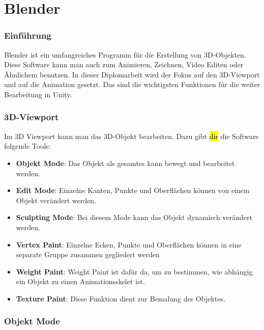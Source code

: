 \pagebreak
{}
\chapter{Blender}

\subsection{Einführung}
Blender ist ein umfangreiches Programm für die Erstellung von 3D-Objekten. Diese Software kann man auch zum Animieren, Zeichnen, Video Editen oder Ähnlichem benutzen. 
In dieser Diplomarbeit wird der Fokus auf den 3D-Viewport und auf die Animation gesetzt. Das sind die wichtigsten Funktionen für die weiter Bearbeitung in Unity. 

\subsection{3D-Viewport}
Im 3D Viewport kann man das 3D-Objekt bearbeiten. Dazu gibt \hl{dir} die Software folgende Tools: 

\begin{itemize}
    \item \textbf{Objekt Mode}:
    \indent Das Objekt als gesamtes kann bewegt und bearbeitet werden. 
    \item \textbf{Edit Mode}:
    \indent Einzelne Kanten, Punkte und Oberflächen können von einem Objekt verändert werden. 
    \item \textbf{Sculpting Mode}:
    \indent Bei diesem Mode kann das Objekt dynamisch verändert werden.
    \item \textbf{Vertex Paint}:
    \indent Einzelne Ecken, Punkte und Oberflächen können in eine separate Gruppe zusammen gegliedert werden
    \item \textbf{Weight Paint}: 
    \indent Weight Paint ist dafür da, um zu bestimmen, wie abhängig ein Objekt zu einen Animationsskelet ist. 
    \item \textbf{Texture Paint}:
    \indent Diese Funktion dient zur Bemalung des Objektes.
\end{itemize}

\pagebreak

\subsection{Objekt Mode}

